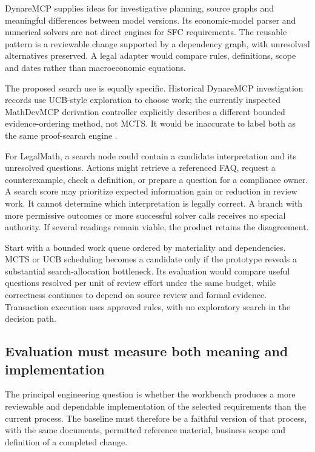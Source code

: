 DynareMCP supplies ideas for investigative planning, source graphs and meaningful
differences between model versions. Its economic-model parser and numerical
solvers are not direct engines for SFC requirements. The reusable pattern is a
reviewable change supported by a dependency graph, with unresolved alternatives
preserved. A legal adapter would compare rules, definitions, scope and dates
rather than macroeconomic equations.

The proposed search use is equally specific. Historical DynareMCP investigation
records use UCB-style exploration to choose work; the currently inspected
MathDevMCP derivation controller explicitly describes a different bounded
evidence-ordering method, not MCTS. It would be inaccurate to label both as the
same proof-search engine \citep{localrepos}.

For LegalMath, a search node could contain a candidate interpretation and its
unresolved questions. Actions might retrieve a referenced FAQ, request a
counterexample, check a definition, or prepare a question for a compliance owner.
A search score may prioritize expected information gain or reduction in review
work. It cannot determine which interpretation is legally correct. A branch with
more permissive outcomes or more successful solver calls receives no special
authority. If several readings remain viable, the product retains the disagreement.

Start with a bounded work queue ordered by materiality and dependencies. MCTS or
UCB scheduling becomes a candidate only if the prototype reveals a substantial
search-allocation bottleneck. Its evaluation would compare useful questions
resolved per unit of review effort under the same budget, while correctness
continues to depend on source review and formal evidence. Transaction execution
uses approved rules, with no exploratory search in the decision path.

\subsection{Evaluation must measure both meaning and implementation}

The principal engineering question is whether the workbench produces a more
reviewable and dependable implementation of the selected requirements than the
current process. The baseline must therefore be a faithful version of that
process, with the same documents, permitted reference material, business scope and
definition of a completed change.


